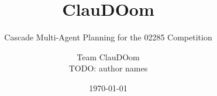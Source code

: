 
\title{ClauDOom}
\subtitle{Cascade Multi-Agent Planning for the 02285 Competition}

\author{Team ClauDOom \\ \small TODO: author names}
\date{\today}
